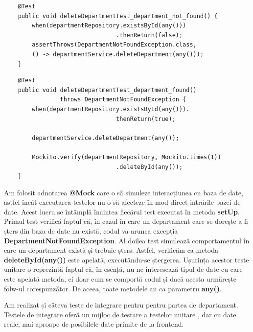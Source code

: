 \begin{center}
\begin{minipage}{0.8\textwidth}
\captionsetup{type=listing}
   \begin{lstlisting}
    @Test
    public void deleteDepartmentTest_department_not_found() {
        when(departmentRepository.existsById(any()))
                                .thenReturn(false);
        assertThrows(DepartmentNotFoundException.class,
        () -> departmentService.deleteDepartment(any()));
    }
    \end{lstlisting} 
\end{minipage}
\end{center}

\begin{center}
\begin{minipage}{0.9\textwidth}
\captionsetup{type=listing}
   \begin{lstlisting}
    @Test
    public void deleteDepartmentTest_department_found() 
                throws DepartmentNotFoundException {
        when(departmentRepository.existsById(any())).
                                thenReturn(true);

        departmentService.deleteDepartment(any());

        Mockito.verify(departmentRepository, Mockito.times(1))
                                .deleteById(any());
    }
    \end{lstlisting} 
\end{minipage}
\end{center}

Am folosit adnotarea \textbf{@Mock} care o să simuleze interacțiunea cu baza de date, astfel încât executarea testelor nu o să afecteze în mod direct intrările bazei de date. Acest lucru se întâmplă înaintea fiecărui test executat în metoda \textbf{setUp}. Primul test verifică faptul că, în cazul în care un departament care se dorește a fi șters din baza de date nu există, codul va arunca excepția \textbf{DepartmentNotFoundException}. Al doilea test simulează comportamentul în care un departament există și trebuie șters. Astfel, verificăm ca metoda \textbf{deleteById(any())} este apelată, executându-se ștergerea. Ușurința acestor teste unitare o reprezintă faptul că, în esență, nu ne interesează tipul de date cu care este apelată metoda, ci doar cum se comportă codul și dacă acesta urmărește folw-ul corespunzător. De aceea, toate metodele au ca parametru \textbf{any()}.

Am realizat și câteva teste de integrare pentru pentru partea de departament. Testele de integrare oferă un mijloc de testare a testelor unitare \cite{citation8}, dar cu date reale, mai aproape de posibilele date primite de la frontend.


